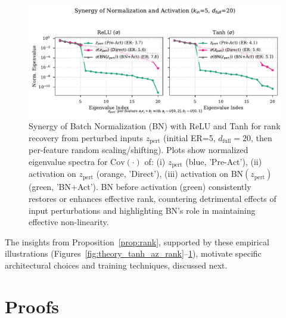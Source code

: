 \documentclass{article}
\begin{document}
\begin{figure}[ht!]
    \centering
    \includegraphics[width=0.7\linewidth]{figures/theory_joint_norm_activation_rank.pdf} %
    \caption{Synergy of Batch Normalization (BN) with ReLU and Tanh for rank recovery from perturbed inputs $z_{\text{pert}}$ (initial ER=5, $d_{\text{full}}=20$, then per-feature random scaling/shifting). Plots show normalized eigenvalue spectra for $\mathrm{Cov}(\cdot)$ of: (i) $z_{\text{pert}}$ (blue, 'Pre-Act'), (ii) activation on $z_{\text{pert}}$ (orange, 'Direct'), (iii) activation on $\text{BN}(z_{\text{pert}})$ (green, 'BN+Act'). BN before activation (green) consistently restores or enhances effective rank, countering detrimental effects of input perturbations and highlighting BN's role in maintaining effective non-linearity.}
    \label{fig:theory_joint_norm_activation_rank}
\end{figure}

The insights from Proposition~\ref{prop:rank}, supported by these empirical illustrations (Figures~\ref{fig:theory_tanh_az_rank}--\ref{fig:theory_joint_norm_activation_rank}), motivate specific architectural choices and training techniques, discussed next.




\section{Proofs}
\label{app:proofs}
\end{document}
